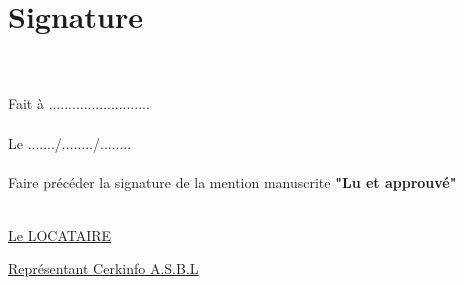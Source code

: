 \documentclass{article}
\begin{document}
\section*{Signature}\\\\
Fait à .......................... \\\\
Le ......./......../........ \\\\
Faire précéder la signature de la mention manuscrite \textbf{"Lu et approuvé"}\\\\

\begin{minipage}{0.5\textwidth}
\underline{Le LOCATAIRE}
\end{minipage}
\begin{minipage}{0.5\textwidth}\raggedleft
\underline{Représentant Cerkinfo A.S.B.L}
\end{minipage}
\end{document}
